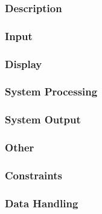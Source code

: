 \documentclass[a4paper, 11pt]{article} %
\begin{document}
\subsubsection{Description}

\subsubsection{Input}

\subsubsection{Display}

\subsubsection{System Processing}

\subsubsection{System Output}

\subsubsection{Other}

\subsubsection{Constraints}

\subsubsection{Data Handling}

\newpage
\end{document}
